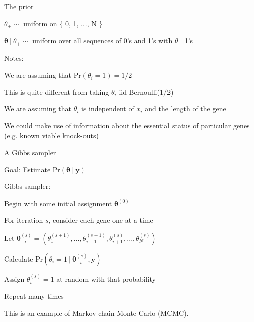 \documentclass[aspectratio=169,12pt,t]{beamer}
\begin{document}
\begin{frame}{The prior}

  \bigskip

  $\theta_+ \sim$ uniform on \{ 0, 1, ..., N \}

  \bigskip

$\boldsymbol{\theta} \ | \ \theta_+ \sim$  uniform over all sequences of 0's and 1's with $\theta_+$ 1's


  \bigskip \bigskip

  {\color{title} Notes:}
  \bi
\item We are assuming that $\text{Pr}(\theta_i = 1) = 1/2$
\item This is quite different from taking $\theta_i$ iid
  Bernoulli(1/2)
\item We are assuming that $\theta_i$ is independent of $x_i$ and the
  length of the gene
\item We could make use of information about the essential status of
  particular genes (e.g. known viable knock-outs)
  \ei


\note{
}

\end{frame}



\begin{frame}[c]{}


\note{
}
\end{frame}



\begin{frame}{A Gibbs sampler}

\bigskip

  {\color{title} Goal}: Estimate $\text{Pr}(\boldsymbol{\theta} \ | \ \boldsymbol{y})$

\bigskip

{\color{title} Gibbs sampler:}
\bi
\item Begin with some initial assignment $\boldsymbol{\theta}^{(0)}$
\item For iteration $s$, consider each gene one at a time
 \bi
  \item Let $\boldsymbol{\theta}_{-i}^{(s)} = (\theta_1^{(s+1)}, ..., \theta_{i-1}^{(s+1)}, \theta_{i+1}^{(s)}, ..., \theta_N^{(s)})$
  \item Calculate $\text{Pr}(\theta_i = 1 \ | \ \boldsymbol{\theta}_{-i}^{(s)}, \boldsymbol{y})$
  \item Assign $\theta_i^{(s)} = 1$ at random with that probability
 \ei
\item Repeat many times
  \ei

\bigskip \bigskip

This is an example of {\vhilit Markov chain Monte Carlo (MCMC)}.

  \note{
  }
\end{frame}
\end{document}
